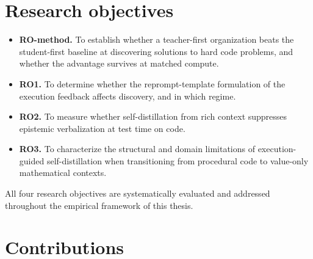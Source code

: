 \section{Research objectives}\label{research-questions}

\begin{itemize}
\tightlist
\item
  \textbf{RO-method.} To establish whether a teacher-first organization beats the student-first baseline at discovering solutions to hard code problems, and whether the advantage survives at matched compute.
\item
  \textbf{RO1.} To determine whether the reprompt-template formulation of the execution feedback affects discovery, and in which regime.
\item
  \textbf{RO2.} To measure whether self-distillation from rich context suppresses epistemic verbalization at test time on code.
\item
  \textbf{RO3.} To characterize the structural and domain limitations of execution-guided self-distillation when transitioning from procedural code to value-only mathematical contexts.
\end{itemize}

All four research objectives are systematically evaluated and addressed throughout the empirical framework of this thesis.

\section{Contributions}\label{contributions}

